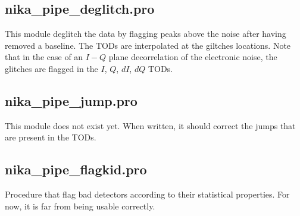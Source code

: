 \documentclass[a4paper]{article}
\begin{document}
\subsection{{\color{blue} nika\_pipe\_deglitch.pro}}
This module deglitch the data by flagging peaks above the noise after having removed a baseline. The TODs are interpolated at the giltches locations. Note that in the case of an $I-Q$ plane decorrelation of the electronic noise, the glitches are flagged in the $I$, $Q$, $dI$, $dQ$ TODs.

\subsection{{\color{blue} nika\_pipe\_jump.pro}}
This module does not exist yet. When written, it should correct the jumps that are present in the TODs.

\subsection{{\color{blue} nika\_pipe\_flagkid.pro}}
Procedure that flag bad detectors according to their statistical properties. For now, it is far from being usable correctly.
\end{document}
